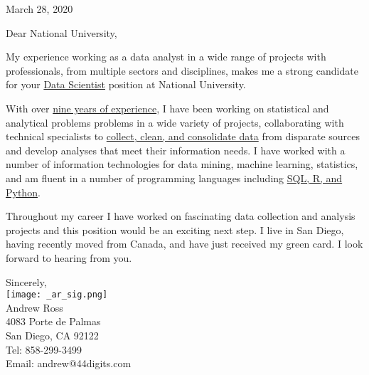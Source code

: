 \documentclass[letterpaper]{article}
\newcommand{\CVjobTitle}{Data Scientist}
\newcommand{\impt}[1]{\uline{#1}}
\begin{document}
\large

\null\hfill March 28, 2020
\vspace{1em}

Dear National University,

My experience working as a data analyst in a wide range of
projects with professionals, from multiple sectors and disciplines, makes me a
strong candidate for your \impt{\CVjobTitle} position at National University.

With over \impt{nine years of experience}, I have been working on statistical and
analytical problems
problems in a wide variety of projects, collaborating with technical specialists to
\impt{collect, clean, and consolidate data} from disparate sources and develop analyses
that meet their information needs.
I have worked with a number of information technologies for 
data mining, machine learning, statistics,
and am fluent in a number of programming languages including \impt{SQL, R, and
Python}.

Throughout my career I have worked on fascinating data collection and analysis
projects and this position would be an exciting next step.  
I live in San Diego, having recently moved from Canada, and have just received
my green card. I look forward to hearing from you.  


Sincerely,\\
\hspace{1em} \texttt{[image: \_ar\_sig.png]} \\
Andrew Ross \\
\small
4083 Porte de Palmas \\
San Diego, CA  92122 \\
Tel: 858-299-3499 \\
Email: andrew@44digits.com
\end{document}
